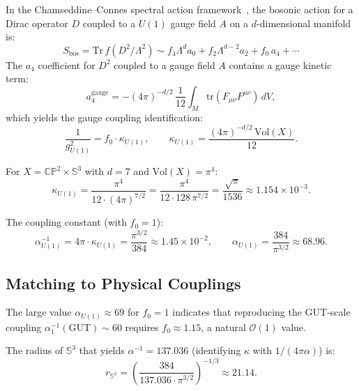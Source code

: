 \documentclass[11pt]{article}
\newcommand{\CP}{\mathbb{CP}}
\newcommand{\Sph}{\mathbb{S}}
\newcommand{\Vol}{\mathrm{Vol}}
\newcommand{\tr}{\mathrm{tr}}
\begin{document}
In the Chamseddine--Connes spectral action framework~\cite{ChamseddineConnes1997},
the bosonic action for a Dirac operator $D$ coupled to a $U(1)$ gauge field $A$
on a $d$-dimensional manifold is:
\begin{equation}
  S_{\mathrm{bos}} = \mathrm{Tr}\,f(D^2/\Lambda^2)
  \sim f_4 \Lambda^d a_0 + f_2 \Lambda^{d-2} a_2 + f_0\, a_4 + \cdots
\end{equation}
The $a_4$ coefficient for $D^2$ coupled to a gauge field $A$ contains a
gauge kinetic term:
\begin{equation}
  a_4^{\mathrm{gauge}} = -(4\pi)^{-d/2}\,\frac{1}{12}
  \int_M \tr(F_{\mu\nu}F^{\mu\nu})\, dV,
\end{equation}
which yields the gauge coupling identification:
\begin{equation}
  \frac{1}{g_{U(1)}^2} = f_0 \cdot \kappa_{U(1)}, \qquad
  \kappa_{U(1)} = \frac{(4\pi)^{-d/2}\,\Vol(X)}{12}.
\end{equation}

For $X = \CP^2 \times \Sph^3$ with $d = 7$ and $\Vol(X) = \pi^4$:
\begin{equation}
  \kappa_{U(1)} = \frac{\pi^4}{12 \cdot (4\pi)^{7/2}}
  = \frac{\pi^4}{12 \cdot 128\,\pi^{7/2}}
  = \frac{\sqrt{\pi}}{1536}
  \approx 1.154 \times 10^{-3}.
\end{equation}

The coupling constant (with $f_0 = 1$):
\begin{equation}
  \alpha_{U(1)}^{-1} = 4\pi \cdot \kappa_{U(1)}
  = \frac{\pi^{3/2}}{384}
  \approx 1.45 \times 10^{-2},
  \qquad
  \alpha_{U(1)} = \frac{384}{\pi^{3/2}} \approx 68.96.
\end{equation}

\subsection{Matching to Physical Couplings}

The large value $\alpha_{U(1)} \approx 69$ for $f_0 = 1$ indicates that
reproducing the GUT-scale coupling $\alpha_1^{-1}(\mathrm{GUT}) \sim 60$
requires $f_0 \approx 1.15$, a natural $\mathcal{O}(1)$ value.

The radius of $\Sph^3$ that yields $\alpha^{-1} = 137.036$ (identifying
$\kappa$ with $1/(4\pi\alpha)$) is:
\begin{equation}
  r_{\Sph^3} = \left(\frac{384}{137.036 \cdot \pi^{3/2}}\right)^{-1/3}
  \approx 21.14.
\end{equation}
\end{document}
